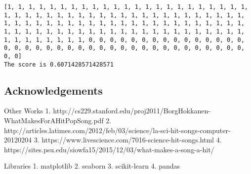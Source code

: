 \documentclass[11pt]{article}
\begin{document}
    \begin{Verbatim}[commandchars=\\\{\}]
[1, 1, 1, 1, 1, 1, 1, 1, 1, 1, 1, 1, 1, 1, 1, 1, 1, 1, 1, 1, 1, 1, 1, 1, 1, 1, 1, 1, 1, 1, 1, 1, 1, 1, 1, 1, 1, 1, 1, 1, 1, 1, 1, 1, 1, 1, 1, 1, 1, 1, 1, 1, 1, 1, 1, 1, 1, 1, 1, 1, 1, 1, 1, 1, 1, 1, 1, 1, 1, 1, 1, 1, 1, 1, 1, 1, 1, 1, 1, 1, 1, 1, 1, 1, 1, 1, 1, 1, 1, 1, 1, 1, 1, 1, 1, 1, 1, 1, 1, 1, 0, 0, 0, 0, 0, 0, 0, 0, 0, 0, 0, 0, 0, 0, 0, 0, 0, 0, 0, 0, 0, 0, 0, 0, 0, 0, 0, 0, 0, 0, 0, 0, 0, 0, 0, 0, 0, 0, 0, 0]
The score is 0.6071428571428571

    \end{Verbatim}

    \hypertarget{acknowledgements}{%
\subsection{Acknowledgements}\label{acknowledgements}}

Other Works 1.
http://cs229.stanford.edu/proj2011/BorgHokkanen-WhatMakesForAHitPopSong.pdf
2.
http://articles.latimes.com/2012/feb/03/science/la-sci-hit-songs-computer-20120204
3. https://www.livescience.com/7016-science-hit-songs.html 4.
https://sites.psu.edu/siowfa15/2015/12/03/what-makes-a-song-a-hit/

Libraries 1. matplotlib 2. seaborn 3. scikit-learn 4. pandas


    
    
    
    
\end{document}
